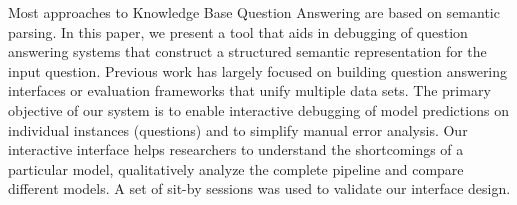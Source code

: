 Most approaches to Knowledge Base Question Answering are based on semantic parsing. In this paper, we present a tool that aids in debugging of question answering systems that construct a structured semantic representation for the input question. Previous work has largely focused on building question answering interfaces or evaluation frameworks that unify multiple data sets. The primary objective of our system is to enable interactive debugging of model predictions on individual instances (questions) and to simplify manual error analysis. Our interactive interface  helps researchers to understand the shortcomings of a particular model, qualitatively analyze the complete pipeline  and compare different models. A set of sit-by sessions was used to validate our interface design.
